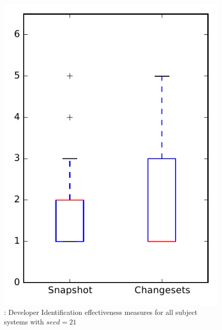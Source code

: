 
\begin{figure}
\centering
\includegraphics[height=0.4\textheight]{figures/dit_seed/rq1_overview_21}
\caption{\rtwo: Developer Identification effectiveness measures for all subject systems with $seed=21$}
\label{fig:dit_seed:rq1:overview}
\end{figure}
